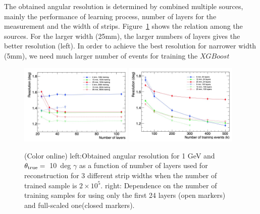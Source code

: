 \documentclass[jkps,preprint,fleqn,showpacs,showkeys]{revtex4}
\newcommand{\XGB}{XGBoost}
\begin{document}
The obtained angular resolution is determined by combined multiple sources, mainly the performance of learning process, number of layers for the measurement and the width of strips. Figure~\ref{fig:multi-parameter} shows the relation among the sources. For the larger width (25mm), the larger numbers of layers gives the better resolution (left). In order to achieve the best resolution for narrower width (5mm), we need much larger number of events for training the $\XGB$  


\begin{figure}[!hbt]
\includegraphics[width=0.48\textwidth]{figures/layer-width.jpg}
\includegraphics[width=0.48\textwidth]{figures/layer-event.jpg}
\caption{ (Color online) left:Obtained angular resolution for 1 GeV and $\theta_{\rm{true}}=$~10~deg $\gamma$ as a function of number of layers used for reconstruction for 3 different strip widths when the number of trained sample is $2 \times 10^5$. right: Dependence on the number of training samples for using only the first 24 layers (open markers) and full-scaled one(closed markers).
}
\label{fig:multi-parameter}
\end{figure}


\end{document}
